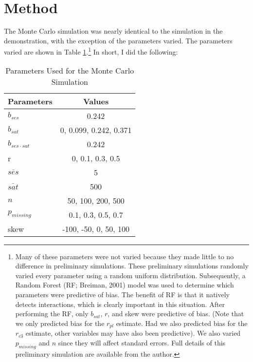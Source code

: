\documentclass[english,man]{apa6}
\newcounter{author}
\theoremstyle{definition}
\theoremstyle{definition}
\theoremstyle{remark}
\begin{document}
\section{Method}\label{method}

The Monte Carlo simulation was nearly identical to the simulation in the
demonstration, with the exception of the parameters varied. The
parameters varied are shown in Table \ref{tab:mcparams}.\footnote{Many
  of these parameters were not varied because they made little to no
  difference in preliminary simulations. These preliminary simulations
  randomly varied every parameter using a random uniform distribution.
  Subsequently, a Random Forest (RF; Breiman, 2001) model was used to
  determine which parameters were predictive of bias. The benefit of RF
  is that it natively detects interactions, which is clearly important
  in this situation. After performing the RF, only \(b_{sat}\), \(r\),
  and skew were predictive of bias. (Note that we only predicted bias
  for the \(r_{pl}\) estimate. Had we also predicted bias for the
  \(r_{c3}\) estimate, other variables may have also been predictive).
  We also varied \(p_{missing}\) and \(n\) since they will affect
  standard errors. Full details of this preliminary simulation are
  available from the author.} In short, I did the following:

\begin{table}[ht]
\centering
\caption{Parameters Used for the Monte Carlo Simulation} 
\label{tab:mcparams}
\begin{tabular}{lc}
  \hline
Parameters & Values \\ 
  \hline
$b_{ses}$ & 0.242 \\ 
  $b_{sat}$ & 0, 0.099, 0.242, 0.371 \\ 
  $b_{ses\cdot sat}$ & 0.242 \\ 
  r & 0, 0.1, 0.3, 0.5 \\ 
  $\bar{ses}$ & 5 \\ 
  $\bar{sat}$ & 500 \\ 
  $n$ & 50, 100, 200, 500 \\ 
  $p_{missing}$ & 0.1, 0.3, 0.5, 0.7 \\ 
  skew & -100, -50, 0, 50, 100 \\ 
   \hline
\end{tabular}
\end{table}
\end{document}
